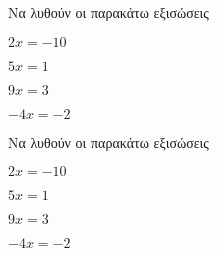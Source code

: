 Να λυθούν οι παρακάτω εξισώσεις
\begin{alist}
\item $ 2x=-10 $
\item $ 5x=1 $
\item $ 9x=3 $
\item $ -4x=-2 $
\end{alist}
Να λυθούν οι παρακάτω εξισώσεις
\begin{alist}
\item $ 2x=-10 $
\item $ 5x=1 $
\item $ 9x=3 $
\item $ -4x=-2 $
\end{alist}
